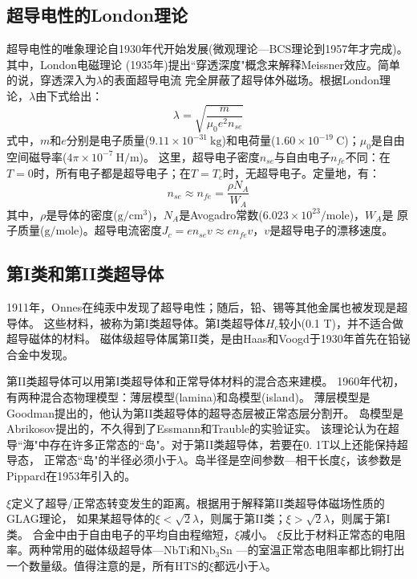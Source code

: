 \subsection{超导电性的London理论}
超导电性的唯象理论自1930年代开始发展(微观理论---BCS理论到1957年才完成)。其中，London电磁理论
(1935年)提出``穿透深度"概念来解释Meissner效应。简单的说，穿透深入为$\lambda$的表面超导电流
完全屏蔽了超导体外磁场。根据London理论，$\lambda$由下式给出：
\begin{equation}
\lambda=\sqrt{\frac{m}{\mu_0 e^2 n_{se}}}
\end{equation}
式中，$m$和$e$分别是电子质量($9.11\times 10^{-31}\ \mathrm{kg}$)和电荷量($1.60\times 10^{-19}\ \mathrm{C}$)；$\mu_0$是自由空间磁导率($4\pi \times 10^{-7}\ \mathrm{H/m}$)。
这里，超导电子密度$n_{se}$与自由电子$n_{fe}$不同：在$T=0$时，所有电子都是超导电子；在$T=T_c$时，无超导电子。定量地，有：
\begin{equation}
n_{se}\approx n_{fe}=\frac{\rho N_A}{W_A}
\end{equation}
其中，$\rho$是导体的密度($\mathrm{g/cm^3}$)，$N_A$是Avogadro常数($6.023\times 10^{23}/\mathrm{mole}$)，$W_A$是
原子质量($\mathrm{g/mole}$)。超导电流密度$J_c=e n_{se} v\approx e n_{fe} v$，$v$是超导电子的漂移速度。

\subsection{第I类和第II类超导体}
1911年，Onnes在纯汞中发现了超导电性；随后，铅、锡等其他金属也被发现是超导体。
这些材料，被称为第I类超导体。第I类超导体$H_c$较小(0.1 T)，并不适合做超导磁体的材料。
磁体级超导体属第II类，是由Haas和Voogd于1930年首先在铅铋合金中发现。

第II类超导体可以用第I类超导体和正常导体材料的混合态来建模。
1960年代初，有两种混合态物理模型：薄层模型(lamina)和岛模型(island)。
薄层模型是Goodman提出的，他认为第II类超导体的超导态层被正常态层分割开。
岛模型是Abrikosov提出的，不久得到了Essmann和Trauble的实验证实。
该理论认为在超导``海"中存在许多正常态的``岛"。对于第II类超导体，若要在0. 1T以上还能保持超导态，
正常态``岛"的半径必须小于$\lambda$。岛半径是空间参数---相干长度$\xi$，该参数是Pippard在1953年引入的。

$\xi$定义了超导/正常态转变发生的距离。根据用于解释第II类超导体磁场性质的GLAG理论，
如果某超导体的$\xi < \sqrt{2}\lambda$，则属于第II类；$\xi >\sqrt{2}\lambda$，则属于第I类。
合金中由于自由电子的平均自由程缩短，$\xi$减小。
$\xi$反比于材料正常态的电阻率。两种常用的磁体级超导体---$\mathrm{NbTi}$和$\mathrm{Nb_3Sn}$
---的室温正常态电阻率都比铜打出一个数量级。值得注意的是，所有HTS的$\xi$都远小于$\lambda$。

